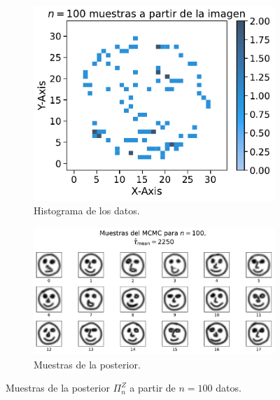 \begin{figure}[H]
    \centering
    \begin{subfigure}[t]{0.35\textwidth}
        \centering
        \includegraphics[width=\textwidth]{img/mcmc/samples-hist-n-100.pdf}
        \caption{Histograma de los datos.}
        \label{fig:samples-hist-n-100}
    \end{subfigure}
    \hfill
    \begin{subfigure}[t]{0.59\textwidth}
        \centering
        \includegraphics[width=\textwidth]{img/mcmc/mcmc-n-100-NUTSPosteriorSampler.pdf}
        \caption{Muestras de la posterior.}
        \label{fig:mcmc-n-100-NUTSPosteriorSampler}
    \end{subfigure}
    \caption{Muestras de la posterior $\Pi^Z_n$ a partir de $n=100$ datos.}
    \label{fig:mcmc-n-100}
\end{figure}

